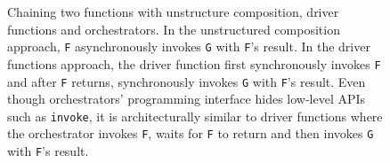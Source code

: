 \begin{figure}[t!]
    \centering
    \caption{Chaining two functions with unstructure composition, driver
    functions and orchestrators. In the unstructured composition approach,
	\texttt{F} asynchronously invokes \texttt{G} with \texttt{F}'s result. In
	the driver functions approach, the driver function first synchronously
	invokes \texttt{F} and after \texttt{F} returns, synchronously invokes
	\texttt{G} with \texttt{F}'s result. Even though orchestrators'
	programming interface hides low-level APIs such as \texttt{invoke}, it is
	architecturally similar to driver functions where the orchestrator invokes
	\texttt{F}, waits for \texttt{F} to return and then invokes \texttt{G}
	with \texttt{F}'s result.}
    \label{fig:chain-example}
\end{figure}

